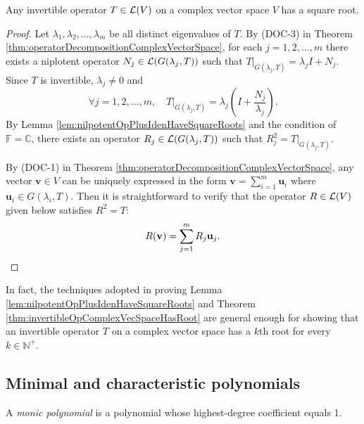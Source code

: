 \begin{thm}
  \label{thm:invertibleOpComplexVecSpaceHasRoot}
  Any invertible operator $T\in {\cal L}(V)$
  on a complex vector space $V$
  has a square root.
\end{thm}
\begin{proof}
  Let $\lambda_1, \lambda_2, \ldots, \lambda_m$
  be all distinct eigenvalues of $T$.
  By (DOC-3) in Theorem
  \ref{thm:operatorDecompositionComplexVectorSpace},
  for each $j=1,2,\ldots,m$ there exists a niplotent operator
  $N_j\in {\cal L}(G(\lambda_j,T))$ 
  such that
  $T|_{G(\lambda_j, T)}=\lambda_jI+N_j$.
  Since $T$ is invertible, $\lambda_j\ne 0$
  and
  \begin{displaymath}
    \forall j=1,2, \ldots, m,\quad
    T|_{G(\lambda_j, T)}=\lambda_j\left(I+\frac{N_j}{\lambda_j}\right).
  \end{displaymath}
  By Lemma \ref{lem:nilpotentOpPlusIdenHaveSquareRoots}
  and the condition of $\mathbb{F}=\mathbb{C}$,
  there exists an operator $R_j\in {\cal L}(G(\lambda_j,T))$
  such that $R_j^2=T|_{G(\lambda_j, T)}$.

  By (DOC-1) in Theorem
  \ref{thm:operatorDecompositionComplexVectorSpace},
  any vector $\mathbf{v}\in V$ can be uniquely expressed
  in the form $\mathbf{v}=\sum_{i=1}^m \mathbf{u}_i$
  where $\mathbf{u}_i\in G(\lambda_i,T)$.
  Then it is straightforward to verify that
  the operator $R\in{\cal L}(V)$ given below
  satisfies $R^2=T$:
  \begin{displaymath}
    R (\mathbf{v}) = \sum_{j=1}^m R_j \mathbf{u}_j. \qedhere
  \end{displaymath}
\end{proof}

\begin{rem}
  In fact, the techniques adopted in
  proving Lemma \ref{lem:nilpotentOpPlusIdenHaveSquareRoots}
  and Theorem \ref{thm:invertibleOpComplexVecSpaceHasRoot}
  are general enough for showing that
  an invertible operator $T$ on a complex vector space
  has a $k$th root for every $k\in \mathbb{N}^+$.
\end{rem}


\subsection{Minimal and characteristic polynomials}
\label{sec:char-minim-polyn}

\begin{defn}
  \label{def:monicPoly}
  A \emph{monic polynomial} is a polynomial
  whose highest-degree coefficient equals 1.
\end{defn}


